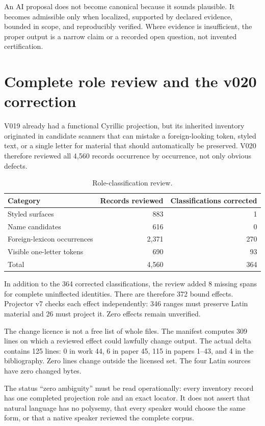 \documentclass[11pt]{article}
\begin{document}
An AI proposal does not become canonical because it sounds plausible. It becomes admissible only when localized, supported by declared evidence, bounded in scope, and reproducibly verified. Where evidence is insufficient, the proper output is a narrow claim or a recorded open question, not invented certification.

\section{Complete role review and the v020 correction}

V019 already had a functional Cyrillic projection, but its inherited inventory originated in candidate scanners that can mistake a foreign-looking token, styled text, or a single letter for material that should automatically be preserved. V020 therefore reviewed all 4,560 records occurrence by occurrence, not only obvious defects.

\begin{table}[ht]
\centering
\caption{Role-classification review.}\label{tab:en-review}
\begin{tabular}{@{}lrr@{}}
\toprule
Category & Records reviewed & Classifications corrected\\
\midrule
Styled surfaces & 883 & 1\\
Name candidates & 616 & 0\\
Foreign-lexicon occurrences & 2,371 & 270\\
Visible one-letter tokens & 690 & 93\\
\midrule
Total & 4,560 & 364\\
\bottomrule
\end{tabular}
\end{table}

In addition to the 364 corrected classifications, the review added 8 missing spans for complete uninflected identities. There are therefore 372 bound effects. Projector v7 checks each effect independently: 346 ranges must preserve Latin material and 26 must project it. Zero effects remain unverified.

The change licence is not a free list of whole files. The manifest computes 309 lines on which a reviewed effect could lawfully change output. The actual delta contains 125 lines: 0 in work 44, 6 in paper 45, 115 in papers 1--43, and 4 in the bibliography. Zero lines change outside the licensed set. The four Latin sources have zero changed bytes.

The status ``zero ambiguity'' must be read operationally: every inventory record has one completed projection role and an exact locator. It does not assert that natural language has no polysemy, that every speaker would choose the same form, or that a native speaker reviewed the complete corpus.
\end{document}

